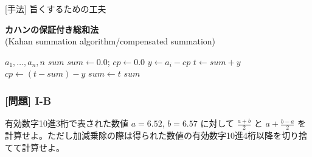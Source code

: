 \documentclass[dvipdfmx,aspectratio=169,20pt]{beamer}
\newcommand{\myfontsetting}[3]{{\fontsize{#1}{#2}\selectfont #3}}
\begin{document}
\begin{frame}{{\large [手法] 旨くするための工夫}}
    \begin{block}{{\bf\small カハンの保証付き総和法}\\
    \vspace{-5mm}
    \myfontsetting{13pt}{18pt}{(Kahan summation algorithm/compensated summation)}}
        \myfontsetting{15pt}{18pt}{
        \begin{algorithmic}[1]
            \REQUIRE $a_1,\dots,a_n,n$
            \ENSURE $sum$
            \STATE $sum \leftarrow 0.0$; $cp \leftarrow 0.0$
            \FOR{$i = 1,2, \dots, n$}
            \STATE $y \leftarrow a_i - cp$
            \STATE $t \leftarrow sum + y$
            \STATE $cp \leftarrow (t-sum) - y$
            \STATE $sum \leftarrow t$
            \ENDFOR
            \RETURN $sum$
        \end{algorithmic}
        }
    \end{block}
\end{frame}
\begin{frame}
\frametitle{[問題] I-B}
有効数字10進3桁で表された数値 $a=6.52$, $b=6.57$ に対して $\frac{a+b}{2}$ と $a+\frac{b-a}{2}$ を計算せよ。ただし加減乗除の際は得られた数値の有効数字10進4桁以降を切り捨てて計算せよ。
\end{frame}
\end{document}
